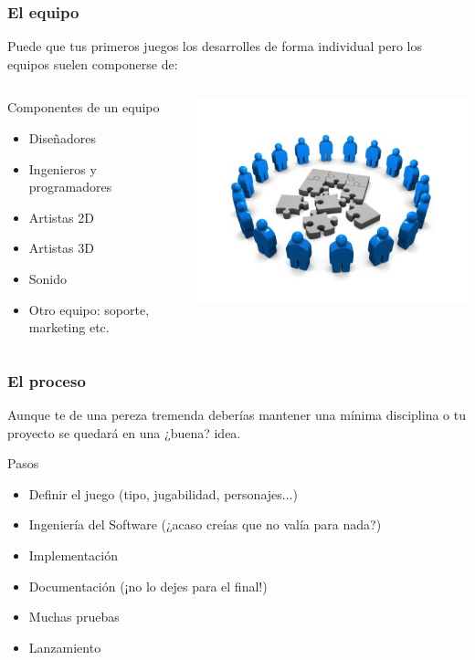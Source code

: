 \begin{frame}
	\frametitle{El equipo}
	
	Puede que tus primeros juegos los desarrolles de forma individual
	pero los equipos suelen componerse de:
		
	\begin{columns}[c]
	\column{200pt}	
	
	\begin{block}{Componentes de un equipo}
		\begin{itemize}
			\item Diseñadores
			\item Ingenieros y programadores
			\item Artistas 2D
			\item Artistas 3D
			\item Sonido
			\item Otro equipo: soporte, marketing etc.
		\end{itemize}            
	\end{block}
	
	\column{100pt}
	\begin{center}
	    \includegraphics[scale=0.3]{img/collaborate.jpg}
	\end{center}
	
	
	\end{columns}
\end{frame}

\begin{frame}
	\frametitle{El proceso}
	
	Aunque te de una pereza tremenda deberías mantener una mínima
	disciplina o tu proyecto se quedará en una ¿buena? idea.
		
	\begin{block}{Pasos}
		\begin{itemize}
			\item Definir el juego (tipo, jugabilidad, personajes...)
			\item Ingeniería del Software (¿acaso creías que no valía para nada?)
			\item Implementación
			\item Documentación (¡no lo dejes para el final!)
			\item Muchas pruebas
			\item Lanzamiento
		\end{itemize}            
	\end{block}        
	
\end{frame}

